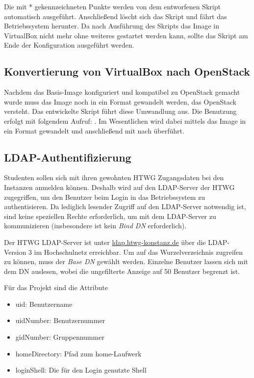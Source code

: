 Die mit * gekennzeichneten Punkte werden von dem entworfenen Skript  automatisch ausgeführt. 
Anschließend löscht sich das Skript und fährt das Betriebssystem herunter.
Da nach Ausführung des  Skripts das Image in VirtualBox nicht mehr ohne weiteres gestartet werden kann, sollte das Skript am Ende der Konfiguration ausgeführt werden.

\subsection{Konvertierung von VirtualBox nach OpenStack}

Nachdem das Basis-Image konfiguriert und kompatibel zu OpenStack gemacht wurde muss das Image noch in ein Format gewandelt werden, das OpenStack versteht.
Das entwickelte Skript  führt diese Umwandlung aus. 
Die Benutzung erfolgt mit folgendem Aufruf: .
Im Wesentlichen wird dabei mittels  das Image in ein  Format gewandelt und anschließend mit  nach  überführt.

\subsection{LDAP-Authentifizierung}

Studenten sollen sich mit ihren gewohnten HTWG Zugangsdaten bei den Instanzen anmelden können. 
Deshalb wird auf den LDAP-Server der HTWG zugegriffen, um den Benutzer beim Login in das Betriebssystem zu authentisieren. 
Da lediglich lesender Zugriff auf den LDAP-Server notwendig ist, sind keine speziellen Rechte erforderlich, um  mit dem LDAP-Server zu kommunizieren (insbesondere ist kein \emph{Bind DN} erforderlich).

Der HTWG LDAP-Server ist unter \url{ldap.htwg-konstanz.de} über die LDAP-Version 3 im Hochschulnetz erreichbar. 
Um auf das Wurzelverzeichnis zugreifen zu können, muss der \emph{Base DN}  gewählt werden. 
Einzelne Benutzer lassen sich mit dem DN  auslesen, wobei die ungefilterte Anzeige auf 50 Benutzer begrenzt ist. 

Für das Projekt sind die Attribute

\begin{itemize}
\item uid: Benutzername
\item uidNumber: Benutzernummer
\item gidNumber: Gruppennummer
\item homeDirectory: Pfad zum home-Laufwerk
\item loginShell: Die für den Login genutzte Shell
\end{itemize}


